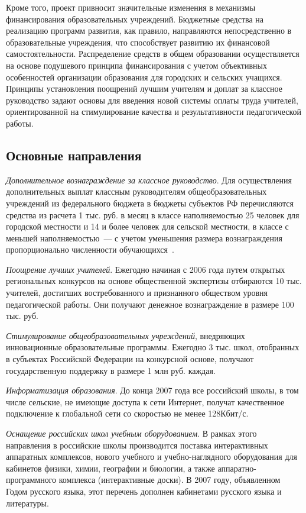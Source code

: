 \documentclass[article, 12pt, russian, oneside]{ncc}
\begin{document}
Кроме того, проект привносит значительные изменения в механизмы
финансирования образовательных учреждений. Бюджетные средства на
реализацию программ развития, как правило, направляются
непосредственно в образовательные учреждения, что способствует
развитию их финансовой самостоятельности. Распределение средств в
общем образовании осуществляется на основе подушевого принципа
финансирования с учетом объективных особенностей организации
образования для городских и сельских учащихся. Принципы установления
поощрений лучшим учителям и доплат за классное руководство задают
основы для введения новой системы оплаты труда учителей,
ориентированной на стимулирование качества и результативности
педагогической работы.

\subsection{Основные направления}

\emph{Дополнительное вознаграждение за классное руководство}. Для
осуществления дополнительных выплат классным руководителям
общеобразовательных учреждений из федерального бюджета в бюджеты
субъектов РФ перечисляются средства из расчета 1 тыс. руб. в месяц в
классе наполняемостью 25 человек для городской местности и 14 и более
человек для сельской местности, в классе с меньшей наполняемостью~---
с учетом уменьшения размера вознаграждения пропорционально численности
обучающихся~\cite{Edu_Goals}.

\emph{Поощрение лучших учителей}. Ежегодно начиная с 2006 года путем
открытых региональных конкурсов на основе общественной экспертизы
отбираются 10 тыс. учителей, достигших востребованного и признанного
обществом уровня педагогической работы. Они получают денежное
вознаграждение в размере 100 тыс. руб.

\emph{Стимулирование общеобразовательных учреждений}, внедряющих
инновационные образовательные программы. Ежегодно 3 тыс. школ,
отобранных в субъектах Российской Федерации на конкурсной основе,
получают государственную поддержку в размере 1 млн руб. каждая.

\emph{Информатизация образования}. До конца 2007 года все российский
школы, в том числе сельские, не имеющие доступа к сети Интернет,
получат качественное подключение к глобальной сети со скоростью не
менее 128Кбит/с.

\emph{ Оснащение российских школ учебным оборудованием}. В рамках
этого направления в российские школы производится поставка
интерактивных аппаратных комплексов, нового учебного и
учебно-наглядного оборудования для кабинетов физики, химии, географии
и биологии, а также аппаратно-программного комплекса (интерактивные
доски). В 2007 году, объявленном Годом русского языка, этот перечень
дополнен кабинетами русского языка и литературы.
\end{document}
